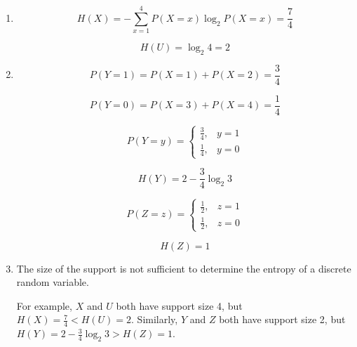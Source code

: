 \documentclass[a4paper]{article}
\begin{document}
\begin{enumerate}

    \item[(a)]
    
    $$
    H(X) = -\sum_{x=1}^{4} P(X=x) \log_2 P(X=x)
    = \frac{7}{4}
    $$

    $$
    H(U) = \log_2 4 = 2
    $$

    \item[(b)]
    
    $$
    P(Y=1) = P(X=1) + P(X=2) = \frac{3}{4}
    $$

    $$
    P(Y=0) = P(X=3) + P(X=4) = \frac{1}{4}
    $$

    $$
    P(Y=y) = 
    \begin{cases}
        \frac{3}{4}, & y=1 \\
        \frac{1}{4}, & y=0
    \end{cases}
    $$

    $$
    H(Y) = 2 - \frac{3}{4} \log_2 3
    $$

    $$
    P(Z=z) = 
    \begin{cases}
        \frac{1}{2}, & z=1 \\
        \frac{1}{2}, & z=0
    \end{cases}
    $$

    $$
    H(Z) = 1
    $$

    \item[(c)]
    
    The size of the support is not sufficient to determine the entropy of a discrete random variable.
    
    For example, $X$ and $U$ both have support size 4, but $H(X) = \frac{7}{4} < H(U) = 2$. Similarly, $Y$ and $Z$ both have support size 2, but $H(Y) = 2 - \frac{3}{4} \log_2 3 > H(Z) = 1$.
\end{enumerate}
\end{document}
